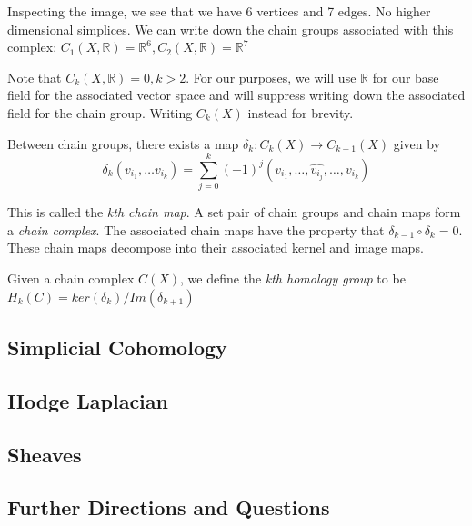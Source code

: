 \documentclass[12pt]{article}
\begin{document}
Inspecting the image, we see that we have 6 vertices and 7 edges. No higher dimensional simplices. 
We can write down the chain groups associated with this complex: $C_1(X, \mathbb{R}) = \mathbb{R}^6 , C_2(X, \mathbb{R}) = \mathbb{R}^7$


Note that $C_k(X, \mathbb{R}) = 0, k > 2$. For our purposes, we will use $\mathbb{R}$ for our base field for the 
associated vector space and will suppress writing down the associated field for the chain group. Writing 
$C_k(X)$ instead for brevity.

Between chain groups, there exists a map $\delta_{k}: C_k(X) \to C_{k-1}(X)$ given by
\begin{equation}
  \delta_k (v_{i_1}, \ldots v_{i_k}) =  \sum_{j = 0}^{k} (-1)^j (v_{i_1}, \ldots, \hat{v_{i_j}} , \ldots, v_{i_k})
\end{equation}

This is called the \textit{kth chain map}. A set pair of chain groups and chain maps form a \textit{chain complex}.
The associated chain maps have the property that $\delta_{k-1} \circ \delta_{k} = 0$. These chain maps decompose 
into their associated kernel and image maps.

Given a chain complex $C(X)$, we define the \textit{kth homology group} to be $H_k(C) = ker(\delta_k) / Im(\delta_{k+1})$

\subsection{Simplicial Cohomology}

\subsection{Hodge Laplacian}

\subsection{Sheaves}

\subsection{Further Directions and Questions}
\end{document}

